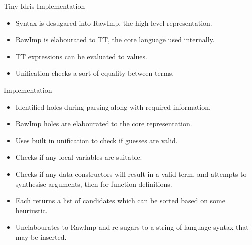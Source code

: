 \documentclass[presentation]{beamer}
\begin{document}
\begin{frame}[fragile]{Tiny Idris Implementation}
    \begin{itemize}
    \item Syntax is desugared into RawImp, the high level representation.\\
    \item RawImp is elabourated to TT, the core language used internally.\\
    \item TT expressions can be evaluated to values.\\
    \item Unification checks a sort of equality between terms.\\
    \end{itemize}
\end{frame}  


\begin{frame}[fragile]{Implementation}
  \begin{itemize}
  \item Identified holes during parsing along with required information.\\
  \item RawImp holes are elabourated to the core representation.\\
  \item Uses built in unification to check if guesses are valid.\\
  \item Checks if any local variables are suitable.\\
  \item Checks if any data constructors will
    result in a valid term, and attempts to synthesise arguments, then for function definitions.\\
  \item Each returns a list of candidates which can be sorted based on some
    heuriustic.\\
  \item Unelabourates to RawImp and re-sugars to a string of
    language syntax that may be inserted.
  \end{itemize}
\end{frame}
\end{document}
